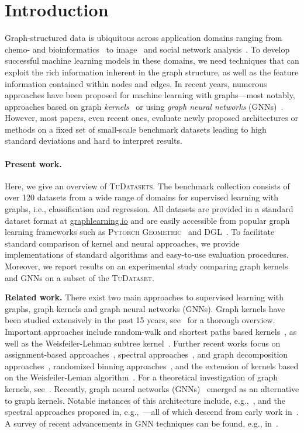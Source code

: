 \documentclass{article}
\newcommand{\xhdr}[1]{{\noindent\bfseries #1}}
\theoremstyle{definition}
\newcommand{\new}[1]{\emph{#1}}
\begin{document}
\section{Introduction}
Graph-structured data is ubiquitous across application domains ranging from chemo- and bioinformatics~\cite{Barabasi2004,Sto+2020} to image~\cite{Sim+2017} and social network analysis~\cite{Eas+2010}. To develop successful machine learning models in these domains, we need techniques that can exploit the rich information inherent in the graph structure, as well as the feature information contained within nodes and edges. In recent years, numerous approaches have been proposed for machine learning with graphs---most notably, approaches based on graph \new{kernels}~\cite{Kri+2019} or using \new{graph neural networks} (GNNs)~\cite{Gil+2017}. However, most papers, even recent ones, evaluate newly proposed architectures or methods on a fixed set of small-scale benchmark datasets leading to high standard deviations and hard to interpret results. 

\paragraph{Present work.} 
Here, we give an overview of \textsc{TuDatasets}. The benchmark collection consists of over 120 datasets from a wide range of domains for supervised learning with graphs, i.e., classification and regression. All datasets are provided in a standard dataset format at \url{graphlearning.io} and are easily accessible from popular graph learning frameworks such as \textsc{Pytorch Geometric}~\cite{Fey+2019} and \textsc{DGL}~\cite{Wan+2019}. To facilitate standard comparison of kernel and neural approaches, we provide implementations of standard algorithms and easy-to-use evaluation procedures. Moreover, we report results on an experimental study comparing graph kernels and GNNs on a subset of the \textsc{TuDataset}.

\xhdr{Related work.}
There exist two main approaches to supervised learning with graphs, graph kernels and graph neural networks (GNNs). Graph kernels have been studied extensively in the past 15 years, see~\cite{Kri+2019} for a thorough overview. Important approaches include random-walk and shortest paths based kernels~\cite{Gae+2003,Sugiyama2015,Bor+2005,Kri+2017b}, as well as the Weisfeiler-Lehman subtree kernel~\cite{She+2011,Mor+2017}. 
Further recent works focus on assignment-based approaches~\cite{Kri+2016,Nik+2017}, spectral approaches~\cite{Kon+2016}, and graph decomposition approaches~\cite{Nik+2018}, randomized binning approaches~\cite{Hei+2019}, and the extension of kernels based on the Weisfeiler-Leman algorithm~\cite{Tog+2019, Rie+2019}. For a theoretical investigation of graph kernels, see~\cite{Kri+2018}. Recently, graph neural networks (GNNs)~\cite{Gil+2017,Sca+2009} emerged as an alternative to graph kernels. Notable instances of this architecture include, e.g.,~\cite{Duv+2015,Ham+2017,Vel+2018}, and the spectral approaches proposed in, e.g.,~\cite{Bru+2014,Def+2015,Kip+2017,Mon+2017}---all of which descend from early work in~\cite{Kir+1995,Mer+2005,Spe+1997,Sca+2009}. A survey of recent advancements in GNN techniques can be found, e.g., in~\cite{Cha+2020,Wu+2019,Zho+2018}.
\end{document}
